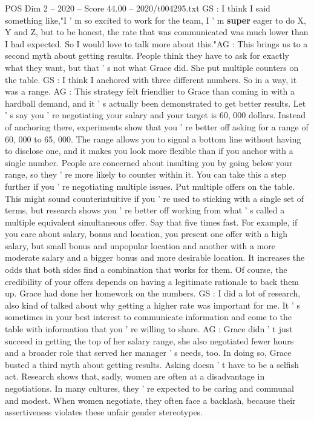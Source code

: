 \begin{textsample}{POS Dim 2 – 2020 – Score 44.00 – 2020/t004295.txt}
GS : I think I said something like,"I ' m so excited to work for the team, I ' m \textbf{super} eager to do X, Y and Z, but to be honest, the rate that was communicated was much lower than I had expected.
So I would love to talk more about this."AG : This brings us to a second myth about getting results.
People think they have to ask for exactly what they want, but that ' s not what Grace did.
She put multiple counters on the table.
GS : I think I anchored with three different numbers.
So in a way, it was a range.
AG : This strategy felt friendlier to Grace than coming in with a hardball demand, and it ' s actually been demonstrated to get better results.
Let ' s say you ' re negotiating your salary and your target is 60, 000 dollars.
Instead of anchoring there, experiments show that you ' re better off asking for a range of 60, 000 to 65, 000.
The range allows you to signal a bottom line without having to disclose one, and it makes you look more flexible than if you anchor with a single number.
People are concerned about insulting you by going below your range, so they ' re more likely to counter within it.
You can take this a step further if you ' re negotiating multiple issues.
Put multiple offers on the table.
This might sound counterintuitive if you ' re used to sticking with a single set of terms, but research shows you ' re better off working from what ' s called a multiple equivalent simultaneous offer.
Say that five times fast.
For example, if you care about salary, bonus and location, you present one offer with a high salary, but small bonus and unpopular location and another with a more moderate salary and a bigger bonus and more desirable location.
It increases the odds that both sides find a combination that works for them.
Of course, the credibility of your offers depends on having a legitimate rationale to back them up.
Grace had done her homework on the numbers.
GS : I did a lot of research, also kind of talked about why getting a higher rate was important for me.
It ' s sometimes in your best interest to communicate information and come to the table with information that you ' re willing to share.
AG : Grace didn ' t just succeed in getting the top of her salary range, she also negotiated fewer hours and a broader role that served her manager ' s needs, too.
In doing so, Grace busted a third myth about getting results.
Asking doesn ' t have to be a selfish act.
Research shows that, sadly, women are often at a disadvantage in negotiations.
In many cultures, they ' re expected to be caring and communal and modest.
When women negotiate, they often face a backlash, because their assertiveness violates these unfair gender stereotypes.

\end{textsample}
